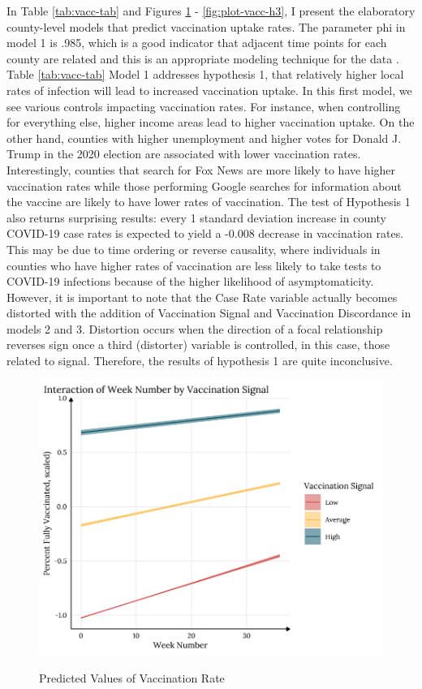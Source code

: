 In Table \ref{tab:vacc-tab} and Figures \ref{fig:plot-vacc-h2} -
\ref{fig:plot-vacc-h3}, I present the elaboratory county-level models that
predict vaccination uptake rates. The parameter phi in model 1 is .985, which is
a good indicator that adjacent time points for each county are related and this
is an appropriate modeling technique for the data \citep{finch_etal14}. Table
\ref{tab:vacc-tab} Model 1 addresses hypothesis 1, that relatively higher local
rates of infection will lead to increased vaccination uptake. In this first
model, we see various controls impacting vaccination rates. For instance, when
controlling for everything else, higher income areas lead to higher vaccination
uptake. On the other hand, counties with higher unemployment and higher votes
for Donald J. Trump in the 2020 election are associated with lower vaccination
rates. Interestingly, counties that search for Fox News are more likely to have
higher vaccination rates while those performing Google searches for information
about the vaccine are likely to have lower rates of vaccination. The test of
Hypothesis 1 also returns surprising results: every 1 standard deviation
increase in county COVID-19 case rates is expected to yield a -0.008 decrease in vaccination rates. This may be due to time ordering or reverse
causality, where individuals in counties who have higher rates of vaccination
are less likely to take tests to COVID-19 infections because of the higher
likelihood of asymptomaticity. However, it is important to note that the Case
Rate variable actually becomes distorted with the addition of Vaccination Signal
and Vaccination Discordance in models 2 and 3. Distortion occurs when the
direction of a focal relationship reverses sign once a third (distorter)
variable is controlled, in this case, those related to signal. Therefore, the
results of hypothesis 1 are quite inconclusive.

\begin{figure}
{\centering \includegraphics[width=0.8\linewidth]{figs/paper3/plot-vacc-h2-1}}
\caption{Predicted Values of Vaccination Rate}\label{fig:plot-vacc-h2}
\end{figure}

